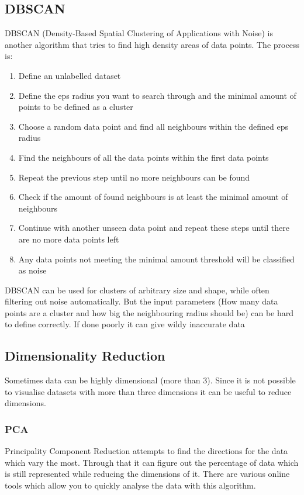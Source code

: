 \documentclass{article}
\begin{document}
	\subsection{DBSCAN}
	DBSCAN (Density-Based Spatial Clustering of Applications with Noise) is another algorithm that tries to find high density areas of data points. The process is:
	\begin{enumerate}
		\item{Define an unlabelled dataset}
		\item{Define the eps radius you want to search through and the minimal amount of points to be defined as a cluster}
		\item{Choose a random data point and find all neighbours within the defined eps radius}
		\item{Find the neighbours of all the data points within the first data points}
		\item{Repeat the previous step until no more neighbours can be found}
		\item{Check if the amount of found neighbours is at least the minimal amount of neighbours}
		\item{Continue with another unseen data point and repeat these steps until there are no more data points left}
		\item{Any data points not meeting the minimal amount threshold will be classified as noise}
	\end{enumerate}
	DBSCAN can be used for clusters of arbitrary size and shape, while often filtering out noise automatically. But the input parameters (How many data points are a cluster and how big the neighbouring radius should be) can be hard to define correctly. If done poorly it can give wildy inaccurate data
	\subsection{Dimensionality Reduction}
	Sometimes data can be highly dimensional (more than 3). Since it is not possible to visualise datasets with more than three dimensions it can be useful to reduce dimensions.
	\subsubsection{PCA}
	Principality Component Reduction attempts to find the directions for the data which vary the most. Through that it can figure out the percentage of data which is still represented while reducing the dimensions of it. There are various online tools which allow you to quickly analyse the data with this algorithm.
\end{document}
